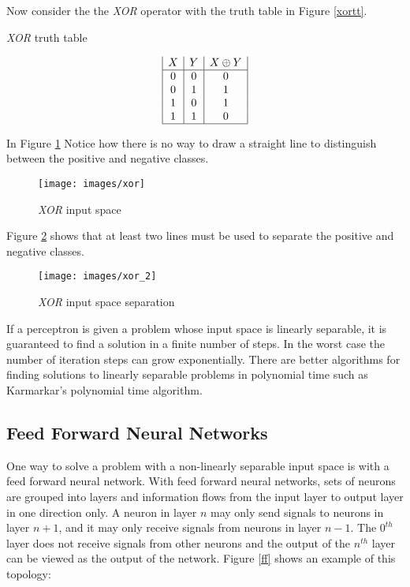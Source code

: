 Now consider the the {\it XOR} operator with the truth table in Figure \ref{xortt}.
\begin{table}[h!]
\caption{{\it XOR} truth table}
\label{xortt}
\begin{displaymath}
\begin{array}{|c|c|c|}
   X
 & Y
 & X \oplus Y
\\
\hline
0 & 0 & 0\\
0 & 1 & 1\\
1 & 0 & 1\\
1 & 1 & 0\\
\hline
\end{array}
\end{displaymath}
\end{table}

In Figure \ref{xors} Notice how there is no way to draw a straight line to distinguish between the positive and negative classes.

\begin{figure}[h!]
  \centering
  \texttt{[image: images/xor]}
  \caption{{\it XOR} input space}
  \label{xors}
\end{figure}

Figure \ref{xorss} shows that at least two lines must be used to separate the positive and negative classes.

\begin{figure}[h!]
  \centering
  \texttt{[image: images/xor\_2]}
  \caption{{\it XOR} input space separation}
  \label{xorss}
\end{figure}

If a perceptron is given a problem whose input space is linearly
separable, it is guaranteed to find a solution in a finite number of
steps\cite{patternRecognition1}. 
In the worst case the number of iteration steps can grow
exponentially\cite{rojas2}.
There are better algorithms for finding solutions to linearly separable problems in
polynomial time such as Karmarkar's polynomial time
algorithm\cite{karmarkar}.

\subsection{Feed Forward Neural Networks} 
One way to solve a problem with a non-linearly separable input space
is with a feed forward neural network.
With feed forward neural networks, sets of neurons are grouped into
layers and information flows from the input layer to output layer in one direction only.
A neuron in layer $n$ may only send signals to neurons in layer $n+1$, and it may only receive signals from neurons in layer $n-1$.
The $0^{th}$ layer does not receive signals from other neurons and the output of the $n^{th}$ layer can be viewed as the output of the network.
Figure \ref{ff} shows an example of this topology:

